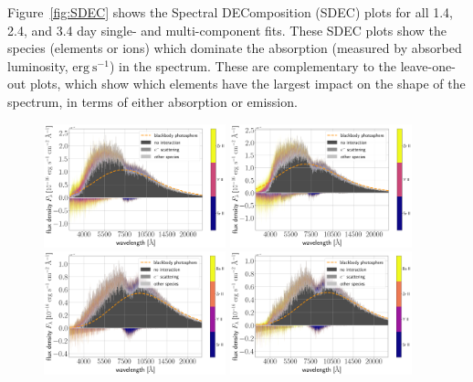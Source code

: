 \documentclass[twocolumn, twocolappendix]{aastex63}
\begin{document}
Figure~\ref{fig:SDEC} shows the Spectral DEComposition (SDEC) plots for all 1.4, 2.4, and 3.4 day single- and multi-component fits. These SDEC plots show the species (elements or ions) which dominate the absorption (measured by absorbed luminosity, $\mathrm{erg~s^{-1}}$) in the spectrum. These are complementary to the leave-one-out plots, which show which elements have the largest impact on the shape of the spectrum, in terms of either absorption or emission.

\begin{figure}[!ht]
    \centering
    \includegraphics[width=0.47\textwidth]{figs/appendix/SDEC/230704_165812_single_TARDIS_eval_SDEC.png}
    \includegraphics[width=0.47\textwidth]{figs/appendix/SDEC/230412_040127_single_TARDIS_eval_SDEC.png}
    \includegraphics[width=0.47\textwidth]{figs/appendix/SDEC/221024_080947_single_TARDIS_eval_SDEC.png}
    \includegraphics[width=0.47\textwidth]{figs/appendix/SDEC/230412_035244_single_TARDIS_eval_SDEC.png}

\end{figure}
\end{document}
